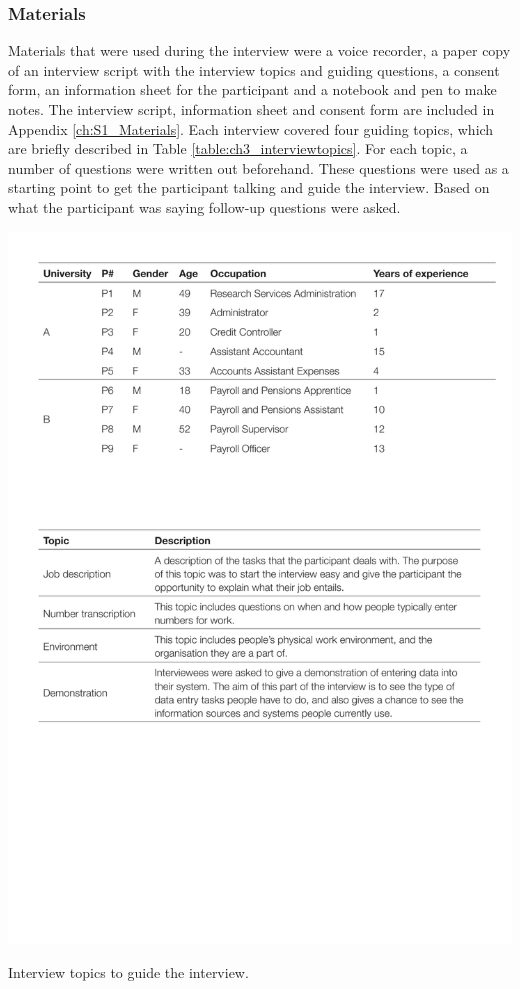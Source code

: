 \subsubsection{Materials}
Materials that were used during the interview were a voice recorder, a paper copy of an interview script with the interview topics and guiding questions, a consent form, an information sheet for the participant and a notebook and pen to make notes. The interview script, information sheet and consent form are included in Appendix \ref{ch:S1_Materials}.
Each interview covered four guiding topics, which are briefly described in Table \ref{table:ch3_interviewtopics}. For each topic, a number of questions were written out beforehand. These questions were used as a starting point to get the participant talking and guide the interview. Based on what the participant was saying follow-up questions were asked. %

\begin{table}[htp]
\centering
\includegraphics[width=\textwidth]{images/ch12/ch12-1_InterviewTopics.pdf}
    \caption[Study 1 interview topics]{Interview topics to guide the interview.}
    \label{table:ch3_interviewtopics}
\end{table}%

